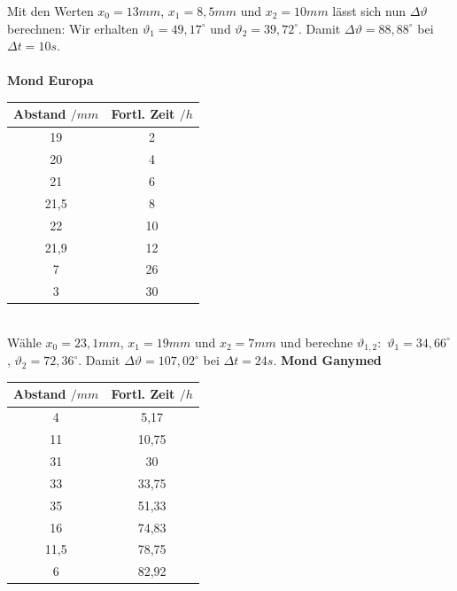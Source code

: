 \documentclass[12pt]{article}
\begin{document}
Mit den Werten $x_0 = 13mm$, $x_1 = 8,5mm$ und $x_2 = 10mm$ lässt sich nun $\Delta \vartheta$ berechnen: Wir erhalten $\vartheta_1 = 49,17^\circ$ und $\vartheta_2 = 39,72^\circ$. Damit $\Delta \vartheta = 88,88^\circ$ bei $\Delta t = 10s$.\\\\
\textbf{Mond Europa}\\
\begin{minipage}{.4\linewidth}
    \vspace*{-1cm}\begin{tabular}{c|c}
    Abstand $/mm$ & Fortl. Zeit $/h$ \\ \hline
    19 & 2 \\
    20 & 4 \\ 
    21 & 6 \\ 
    21,5 & 8 \\ 
    22 & 10 \\ 
    21,9 & 12 \\ 
    7 & 26 \\ 
    3 & 30 \\ 
\end{tabular}
\end{minipage}
\begin{minipage}{.5\linewidth}
    \centering
{}
\end{minipage}\\
Wähle $x_0 = 23,1mm$, $x_1 = 19mm$ und $x_2 = 7mm$ und berechne $\vartheta_{1,2}:$ $\vartheta_1 = 34,66^\circ$, $\vartheta_2 = 72,36^\circ$. Damit $\Delta \vartheta = 107,02^\circ$ bei $\Delta t= 24s$. 
\newpage\noindent
\textbf{Mond Ganymed}\\
\begin{minipage}{.4\linewidth}
    \vspace*{-1cm}\begin{tabular}{c|c}
    Abstand $/mm$ & Fortl. Zeit $/h$ \\ \hline
    4 & 5,17 \\
    11 & 10,75 \\ 
    31 & 30 \\ 
    33 & 33,75 \\ 
    35 & 51,33 \\ 
    16 & 74,83 \\ 
    11,5 & 78,75 \\ 
    6 & 82,92 \\ 
\end{tabular}
\end{minipage}
\end{document}
